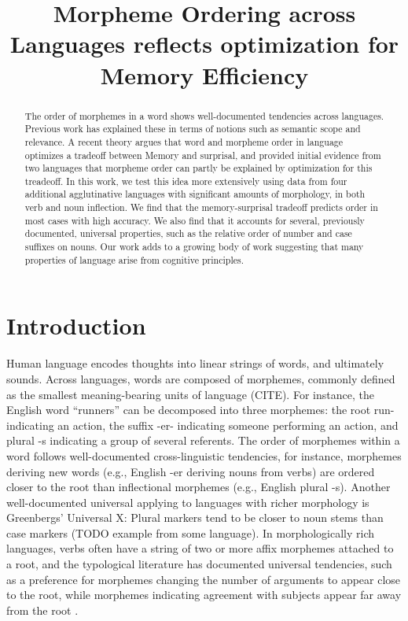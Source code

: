 \documentclass[11pt,letterpaper]{article}
\title{Morpheme Ordering across Languages reflects optimization for Memory Efficiency}
\begin{document}
\maketitle

\begin{abstract}
The order of morphemes in a word shows well-documented tendencies across languages.
Previous work has explained these in terms of notions such as semantic scope and relevance.
A recent theory argues that word and morpheme order in language optimizes a tradeoff between Memory and surprisal, and provided initial evidence from two languages that morpheme order can partly be explained by optimization for this treadeoff.
In this work, we test this idea more extensively using data from four additional agglutinative languages with significant amounts of morphology, in both verb and noun inflection.
We find that the memory-surprisal tradeoff predicts order in most cases with high accuracy.
We also find that it accounts for several, previously documented, universal properties, such as the relative order of number and case suffixes on nouns.
Our work adds to a growing body of work suggesting that many properties of language arise from cognitive principles.
\end{abstract}


\section{Introduction}

Human language encodes thoughts into linear strings of words, and ultimately sounds.
Across languages, words are composed of morphemes, commonly defined as the smallest meaning-bearing units of language  (CITE).
For instance, the English word ``runners'' can be decomposed into three morphemes: the root run- indicating an action, the suffix -er- indicating someone performing an action, and plural -s indicating a group of several referents.
The order of morphemes within a word follows well-documented cross-linguistic tendencies, for instance, morphemes deriving new words (e.g., English -er deriving nouns from verbs) are ordered closer to the root than inflectional morphemes (e.g., English plural -s).
Another well-documented universal applying to languages with richer morphology is Greenbergs' Universal X:
Plural markers tend to be closer to noun stems than case markers \citep[112]{greenberg1963universals} (TODO example from some language).
In morphologically rich languages, verbs often have a string of two or more affix morphemes attached to a root, and the typological literature has documented universal tendencies, such as a preference for morphemes changing the number of arguments to appear close to the root, while morphemes indicating agreement with subjects appear far away from the root \citep{bybee-morphology-1985}.
\end{document}
